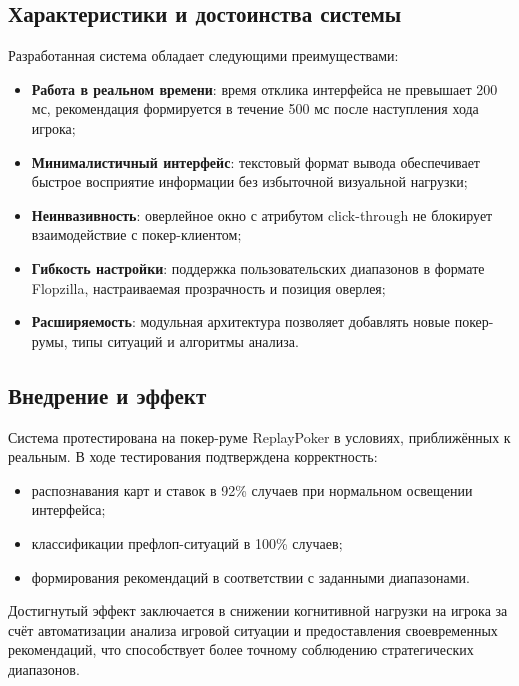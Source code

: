 \subsection*{Характеристики и достоинства системы}

Разработанная система обладает следующими преимуществами:

\begin{itemize}
    \item \textbf{Работа в реальном времени}: время отклика интерфейса не превышает 200 мс, рекомендация формируется в течение 500 мс после наступления хода игрока;
    
    \item \textbf{Минималистичный интерфейс}: текстовый формат вывода обеспечивает быстрое восприятие информации без избыточной визуальной нагрузки;
    
    \item \textbf{Неинвазивность}: оверлейное окно с атрибутом click-through не блокирует взаимодействие с покер-клиентом;
    
    \item \textbf{Гибкость настройки}: поддержка пользовательских диапазонов в формате Flopzilla, настраиваемая прозрачность и позиция оверлея;
    
    \item \textbf{Расширяемость}: модульная архитектура позволяет добавлять новые покер-румы, типы ситуаций и алгоритмы анализа.
\end{itemize}

\subsection*{Внедрение и эффект}

Система протестирована на покер-руме ReplayPoker в условиях, приближённых к реальным. В ходе тестирования подтверждена корректность:
\begin{itemize}
    \item распознавания карт и ставок в 92\% случаев при нормальном освещении интерфейса;
    \item классификации префлоп-ситуаций в 100\% случаев;
    \item формирования рекомендаций в соответствии с заданными диапазонами.
\end{itemize}

Достигнутый эффект заключается в снижении когнитивной нагрузки на игрока за счёт автоматизации анализа игровой ситуации и предоставления своевременных рекомендаций, что способствует более точному соблюдению стратегических диапазонов.

